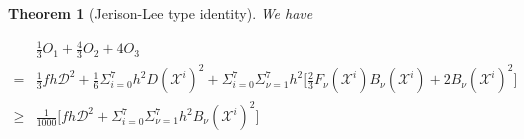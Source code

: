 \documentclass[reqno,12pt]{amsart}
\numberwithin{equation}{section}
\theoremstyle{plain}
\newtheorem{theorem}{Theorem}[section]
\theoremstyle{definition}
\begin{document}
\begin{theorem}[Jerison-Lee type identity]We have

 

  \begin{equation}\label{jl}
     \begin{aligned}
        &\frac{1}{3}O_1+\frac{4}{3}O_2+4O_3\\=& \frac{1}{3}fh\mathcal{D}^2+\frac{1}{6}\Sigma_{i=0}^7h^2 D(\mathscr{X}^i)^2+
        \Sigma_{i=0}^7\Sigma_{\nu=1}^7h^2\bigg[\frac{2}{3}F_\nu(\mathscr{X}^i)B_\nu (\mathscr{X}^i)+2 B_\nu(\mathscr{X}^i)^2\bigg]\\\geq & \frac{1}{1000}\bigg[fh\mathcal{D}^2+\Sigma_{i=0}^7\Sigma_{\nu=1}^7h^2B_\nu (\mathscr{X}^i)^2\bigg]
     \end{aligned}
 \end{equation}\end{theorem}
\end{document}
